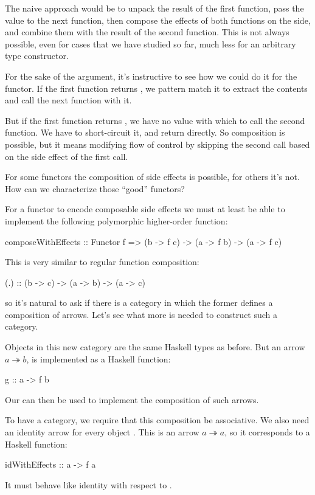 \documentclass[DaoFP]{subfiles}
\begin{document}
The naive approach would be to unpack the result of the first function, pass the value to the next function, then compose the effects of both functions on the side, and combine them with the result of the second function. This is not always possible, even for cases that we have studied so far, much less for an arbitrary type constructor.

For the sake of the argument, it's instructive to see how we could do it for the  functor. If the first function returns , we pattern match it to extract the contents and call the next function with it.

But if the first function returns , we have no value with which to call the second function. We have to short-circuit it, and return  directly. So composition is possible, but it means modifying flow of control by skipping the second call based on the side effect of the first call. 

For some functors the composition of side effects is possible, for others it's not. How can we characterize those ``good'' functors?

For a functor to encode composable side effects we must at least be able to implement the following polymorphic higher-order function: 
\begin{haskell}
composeWithEffects :: Functor f => 
       (b -> f c) -> (a -> f b) -> (a -> f c)
\end{haskell}
This is very similar to regular function composition:
\begin{haskell}
(.) :: (b -> c) -> (a -> b) -> (a -> c)
\end{haskell}
so it's natural to ask if there is a category in which the former defines a composition of arrows. Let's see what more is needed to construct such a category.

Objects in this new category are the same Haskell types as before. But an arrow $a \twoheadrightarrow b$, is implemented as a Haskell function:
\begin{haskell}
g :: a -> f b
\end{haskell}
Our  can then be used to implement the composition of such arrows. 

To have a category, we require that this composition be associative. We also need an identity arrow for every object . This is an arrow $a \twoheadrightarrow a$, so it corresponds to a Haskell function:
\begin{haskell}
idWithEffects :: a -> f a
\end{haskell}
It must behave like identity with respect to .
\end{document}
